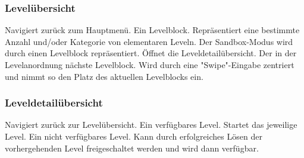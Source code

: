 \subsubsection{Levelübersicht}
\begin{requirements}
 Navigiert zurück zum Hauptmenü.
 Ein Levelblock. Repräsentiert eine bestimmte Anzahl und/oder Kategorie von elementaren Leveln. Der Sandbox-Modus wird durch einen Levelblock repräsentiert. Öffnet die Leveldetailübersicht.
 Der in der Levelanordnung nächste Levelblock. Wird durch eine "Swipe"-Eingabe zentriert und nimmt so den Platz des aktuellen Levelblocks ein.
\end{requirements}

\begin{center}
\setlength\fboxsep{20pt}
\setlength\fboxrule{1pt}
\end{center}

\subsubsection{Leveldetailübersicht}
\begin{requirements}
 Navigiert zurück zur Levelübersicht.
 Ein verfügbares Level. Startet das jeweilige Level.
 Ein nicht verfügbares Level. Kann durch erfolgreiches Lösen der vorhergehenden Level freigeschaltet werden und wird dann verfügbar.
\end{requirements}

